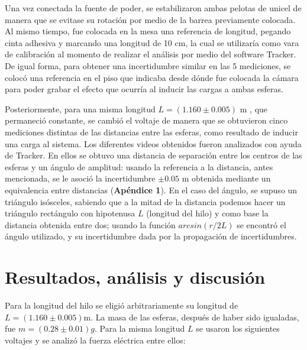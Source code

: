 \documentclass[letterpaper, 11 pt]{article}
\begin{document}
\begin{multicols*}{2}
 
Una vez conectada la fuente de poder, se estabilizaron ambas pelotas de unicel de manera que se evitase su rotación por medio de la barrea previamente colocada. Al mismo tiempo, fue colocada en la mesa una referencia de longitud, pegando cinta adhesiva y marcando una longitud de 10 cm, la cual se utilizaría como vara de calibración al momento de realizar el análisis por medio del software Tracker. De igual forma, para obtener una incertidumbre similar en las 5 mediciones, se colocó una referencia en el piso que indicaba desde dónde fue colocada la cámara para poder grabar el efecto que ocurría al inducir las cargas a ambas esferas.

Posteriormente, para una misma longitud $L=(1.160 \pm 0.005)$ m , que permaneció constante, se cambió el voltaje de manera que se obtuvieron cinco mediciones distintas de las distancias entre las esferas, como resultado de inducir una carga al sistema.
Los diferentes videos obtenidos fueron analizados con ayuda de Tracker. En ellos se obtuvo una distancia de separación entre los centros de las esferas y un ángulo de amplitud: usando la referencia a la distancia, antes mencionada, se le asoció la incertidumbre $\pm 0.05$ m obtenida mediante un equivalencia entre distancias (\textbf{Apéndice 1}). En el caso del ángulo, se supuso un triángulo isósceles, sabiendo que a la mitad de la distancia podemos hacer un triángulo rectángulo con hipotenusa $L$ (longitud del hilo) y como base la distancia obtenida entre dos; usando la función $arcsin(r/2L)$ se encontró el ángulo utilizado, y su incertidumbre dada por la propagación de incertidumbres.




\section{Resultados, análisis y discusión}

Para la longitud del hilo se eligió arbitrariamente su longitud de $L = (1.160 \pm 0.005)$m. La masa de las esferas, después de haber sido igualadas, fue $m = (0.28\pm 0.01)g$. Para la misma longitud $L$ se usaron los siguientes voltajes y se analizó la fuerza eléctrica entre ellos:


\end{multicols*}
\end{document}
